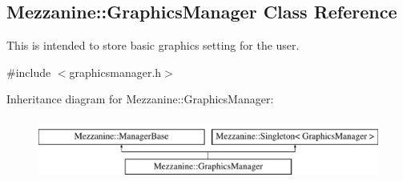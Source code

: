 \hypertarget{classMezzanine_1_1GraphicsManager}{
\subsection{Mezzanine::GraphicsManager Class Reference}
\label{classMezzanine_1_1GraphicsManager}
}


This is intended to store basic graphics setting for the user.  




{\ttfamily \#include $<$graphicsmanager.h$>$}

Inheritance diagram for Mezzanine::GraphicsManager:\begin{figure}[H]
\begin{center}
\leavevmode
\includegraphics[height=2.000000cm]{classMezzanine_1_1GraphicsManager}
\end{center}
\end{figure}
